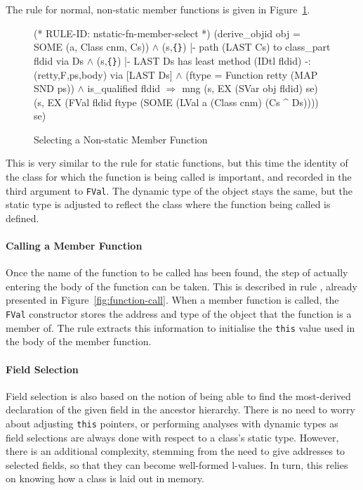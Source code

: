 \documentclass[11pt]{article}
\newcommand{\lbr}{\texttt{\{}}
\newcommand{\rbr}{\texttt{\}}}
\begin{document}
The rule for normal, non-static  member functions is given in
Figure~\ref{fig:nstatic-fn-member-select}.
\begin{figure}
%
\begin{stdrule}
(* RULE-ID: nstatic-fn-member-select *)
     (derive_objid obj = SOME (a, Class cnm, Cs)) \(\land\)
     (s,\lbr\rbr) |- path (LAST Cs) to class_part fldid via Ds \(\land\)
     (s,\lbr\rbr) |- LAST Ds has least method
                  (IDtl fldid) -: (retty,F,ps,body)
                  via [LAST Ds] \(\land\)
     (ftype = Function retty (MAP SND ps)) \(\land\)
     is_qualified fldid
   \(\Rightarrow\)
     mng (s, EX (SVar obj fldid) se)
         (s, EX (FVal fldid ftype
                      (SOME (LVal a (Class cnm) (Cs ^ Ds))))
                se)
\end{stdrule}
\caption{Selecting a Non-static Member Function}
\label{fig:nstatic-fn-member-select}
\end{figure}
This is very similar to the rule for static functions, but this time
the identity of the class for which the function is being called is
important, and recorded in the third argument to \texttt{FVal}.  The
dynamic type of the object stays the same, but the static type is
adjusted to reflect the class where the function being called is
defined.

\paragraph{Calling a Member Function}
Once the name of the function to be called has been found, the step of
actually entering the body of the function can be taken.  This is
described in rule , already presented in
Figure~\ref{fig:function-call}.%
%
When a member function is called, the \texttt{FVal} constructor stores
the address and type of the object that the function is a member of.
The rule extracts this information to initialise the \texttt{this}
value used in the body of the member function.

\paragraph{Field Selection}
Field selection is also based on the notion of being able to find the
most-derived declaration of the given field in the ancestor hierarchy.
There is no need to worry about adjusting \texttt{this} pointers, or
performing analyses with dynamic types as field selections are always
done with respect to a class's static type.  However, there is an
additional complexity, stemming from the need to give addresses to
selected fields, so that they can become well-formed l-values.  In
turn, this relies on knowing how a class is laid out in memory.
\end{document}

